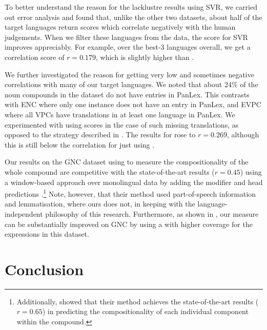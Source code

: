 \documentclass[output=paper,modfonts,nonflat]{langsci/langscibook}
\begin{document}
To better understand the reason for the lacklustre results using SVR, we
carried out error analysis and found that, unlike the other two
datasets, about half of the target languages return scores which
correlate negatively with the human judgements. When we filter these
languages from the data, the score for SVR improves appreciably. For
example, over the best-3 languages overall, we get a correlation score
of $r = 0.179$, which is slightly higher than \CSsourcetarg.

We further investigated the reason for getting very low and sometimes
negative correlations with many of our target languages. We noted that
about 24\% of the  noun compounds in the dataset do not have
entries in PanLex. This contrasts with ENC where only one instance
does not have an entry in PanLex, and EVPC where all VPCs have
translations in at least one language in PanLex. We experimented with
using  scores in the case of such missing
translations, as opposed to the strategy described in
. The results for \CSsvr rose to $r =
0.269$, although this is still below the correlation for just using
.

Our results on the GNC dataset using  to measure the
compositionality of the whole compound are competitive with the
state-of-the-art results ($r = 0.45$) using a window-based
 approach over monolingual  data by
adding the modifier and head predictions
\citep{SchulteImWalde+:2013}.\footnote{Additionally,
  \cite{SchulteImWalde+:2013} showed that their method achieves the
  state-of-the-art results ($r = 0.65$) in predicting the
  compositionality of each individual component within the compound.}
Note, however, that their method used part-of-speech information and
lemmatisation, where ours does not, in keeping with the
language-independent philosophy of this research. Furthermore, as
shown in , our  measure can be
substantially improved on GNC by using a  with
higher coverage for the expressions in this dataset.





\section{Conclusion}
\end{document}
